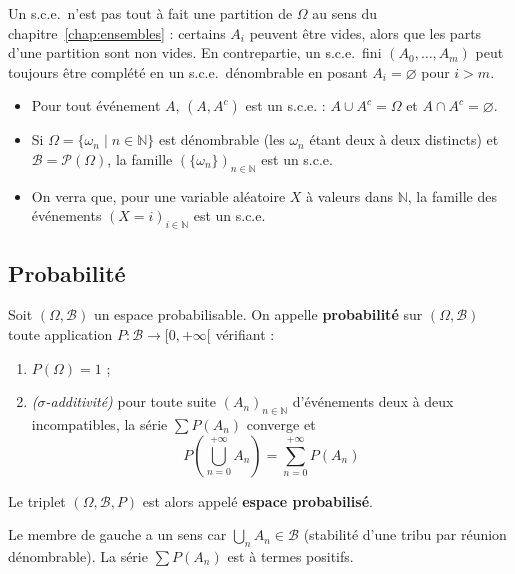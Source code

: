 \begin{remarque}
Un s.c.e.\ n'est pas tout à fait une partition de $\Omega$ au sens du chapitre~\ref{chap:ensembles} : certains $A_i$ peuvent être vides, alors que les parts d'une partition sont non vides. En contrepartie, un s.c.e.\ fini $(A_0,\dots,A_m)$ peut toujours être complété en un s.c.e.\ dénombrable en posant $A_i=\varnothing$ pour $i>m$.
\end{remarque}

\begin{exemple}
\begin{itemize}
\item Pour tout événement $A$, $(A,A^c)$ est un s.c.e. : $A\cup A^c=\Omega$ et $A\cap A^c=\varnothing$.
\item Si $\Omega=\{\omega_n\mid n\in\mathbb{N}\}$ est dénombrable (les $\omega_n$ étant deux à deux distincts) et $\mathcal{B}=\mathcal{P}(\Omega)$, la famille $(\{\omega_n\})_{n\in\mathbb{N}}$ est un s.c.e.
\item On verra que, pour une variable aléatoire $X$ à valeurs dans $\mathbb{N}$, la famille des événements $(X=i)_{i\in\mathbb{N}}$ est un s.c.e.
\end{itemize}
\end{exemple}

\subsection{Probabilité}

\begin{defi}[Probabilité]
\label{defi:probabilite}
Soit $(\Omega,\mathcal{B})$ un espace probabilisable. On appelle \textbf{probabilité} sur $(\Omega,\mathcal{B})$ toute application $P:\mathcal{B}\to[0,+\infty[$ vérifiant :
\begin{enumerate}
\item $P(\Omega)=1$ ;
\item \emph{($\sigma$-additivité)} pour toute suite $(A_n)_{n\in\mathbb{N}}$ d'événements deux à deux incompatibles, la série $\sum P(A_n)$ converge et
\[P\left(\bigcup_{n=0}^{+\infty}A_n\right)=\sum_{n=0}^{+\infty}P(A_n)\]
\end{enumerate}
Le triplet $(\Omega,\mathcal{B},P)$ est alors appelé \textbf{espace probabilisé}.
\end{defi}

\begin{remarque}
Le membre de gauche a un sens car $\bigcup_nA_n\in\mathcal{B}$ (stabilité d'une tribu par réunion dénombrable). La série $\sum P(A_n)$ est à termes positifs.
\end{remarque}

